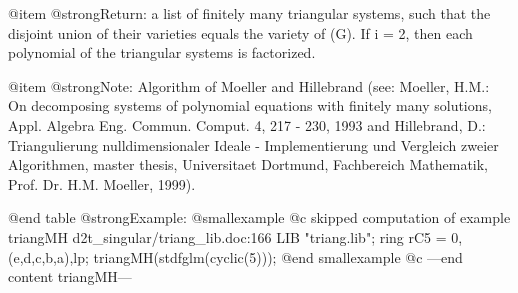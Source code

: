 @item @strong{Return:}
a list of finitely many triangular systems, such that
the disjoint union of their varieties equals the variety of (G).
If i = 2, then each polynomial of the triangular systems is factorized.

@item @strong{Note:}
Algorithm of Moeller and Hillebrand (see: Moeller, H.M.:
On decomposing systems of polynomial equations with finitely many
solutions, Appl. Algebra Eng. Commun. Comput. 4, 217 - 230, 1993 and
Hillebrand, D.: Triangulierung nulldimensionaler Ideale -
Implementierung und Vergleich zweier Algorithmen, master thesis,
Universitaet Dortmund, Fachbereich Mathematik, Prof. Dr. H.M. Moeller,
1999).

@end table
@strong{Example:}
@smallexample
@c skipped computation of example triangMH d2t_singular/triang_lib.doc:166 
LIB "triang.lib";
ring rC5 = 0,(e,d,c,b,a),lp;
triangMH(stdfglm(cyclic(5)));
@end smallexample
@c ---end content triangMH---
